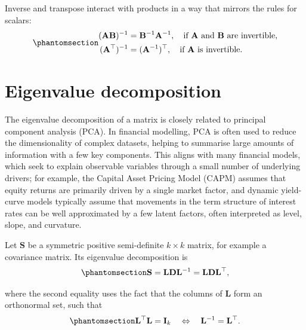 \documentclass[
  letterpaper,
  DIV=11,
  numbers=noendperiod]{scrreprt}
\begin{document}
Inverse and transpose interact with products in a way that mirrors the
rules for scalars:
\begin{equation}\protect\phantomsection\label{eq-gen-0054}{  
\begin{align}
(\mathbf{A}\mathbf{B})^{-1} &= \mathbf{B}^{-1}\mathbf{A}^{-1},
\quad\text{if $\mathbf{A}$ and $\mathbf{B}$ are invertible}, \\
(\mathbf{A}^{\top})^{-1} &= (\mathbf{A}^{-1})^{\top},
\quad\text{if $\mathbf{A}$ is invertible}.
\end{align}
}\end{equation}

\section{Eigenvalue decomposition}\label{eigenvalue-decomposition}

The eigenvalue decomposition of a matrix is closely related to principal
component analysis (PCA). In financial modelling, PCA is often used to
reduce the dimensionality of complex datasets, helping to summarise
large amounts of information with a few key components. This aligns with
many financial models, which seek to explain observable variables
through a small number of underlying drivers; for example, the Capital
Asset Pricing Model (CAPM) assumes that equity returns are primarily
driven by a single market factor, and dynamic yield-curve models
typically assume that movements in the term structure of interest rates
can be well approximated by a few latent factors, often interpreted as
level, slope, and curvature.

Let \(\mathbf{S}\) be a symmetric positive semi-definite \(k\times k\)
matrix, for example a covariance matrix. Its eigenvalue decomposition is
\begin{equation}\protect\phantomsection\label{eq-gen-0055}{  
\begin{align}
    \mathbf{S} = \mathbf{L}\mathbf{D}\mathbf{L}^{-1} = \mathbf{L}\mathbf{D}\mathbf{L}^{\top},
\end{align}
}\end{equation}

where the second equality uses the fact that the columns of
\(\mathbf{L}\) form an orthonormal set, such that
\begin{equation}\protect\phantomsection\label{eq-gen-0056}{  
\begin{align}
    \mathbf{L}^{\top}\mathbf{L} = \mathbf{I}_k \quad \Leftrightarrow \quad \mathbf{L}^{-1} = \mathbf{L}^{\top}.
\end{align}
}\end{equation}
\end{document}
